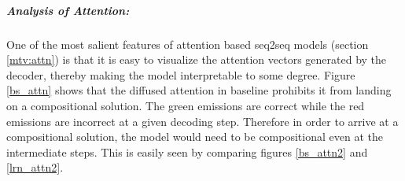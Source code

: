 \subparagraph{Analysis of Attention:} One of the most salient features of attention based seq2seq models (section \ref{mtv:attn}) is that it is easy to visualize the attention vectors generated by the decoder, thereby making the model interpretable to some degree. Figure \ref{bs_attn} shows that the diffused attention in baseline prohibits it from landing on a compositional solution. The green emissions are correct while the red emissions are incorrect at a given decoding step. Therefore in order to arrive at a compositional solution, the model would need to be compositional even at the intermediate steps. This is easily seen by comparing figures \ref{bs_attn2} and \ref{lrn_attn2}.


